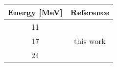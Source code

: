 \begin{tabular}{c c} 
    \toprule 
    \bf{Energy [MeV]} & \bf{Reference} \\
    \midrule
    11 & \cite{Rapaport80}\\
    17 & this work\\
    24 & \cite{Rapaport80}\\
    \bottomrule
\end{tabular}
